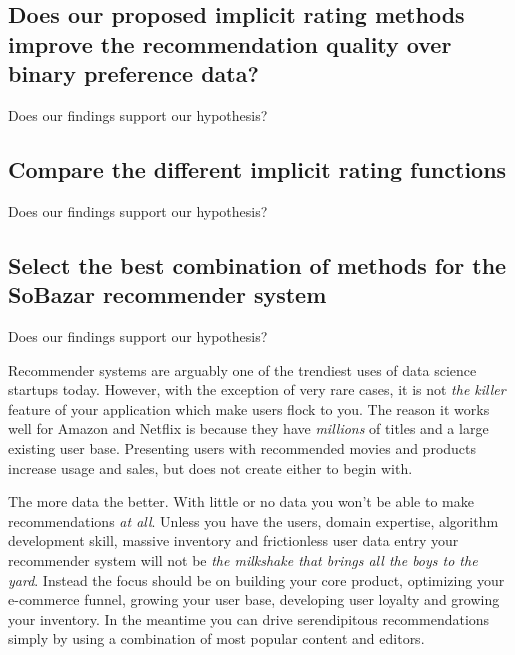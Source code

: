\subsection{Does our proposed implicit rating methods improve the recommendation quality over binary preference data?}

Does our findings support our hypothesis?



\subsection{Compare the different implicit rating functions}

Does our findings support our hypothesis?

\subsection{Select the best combination of methods for the SoBazar recommender system}

Does our findings support our hypothesis?












Recommender systems are arguably one of the trendiest uses of data science startups today. However, with the exception of very
rare cases, it is not \emph{the killer} feature of your application which make users flock to you. The reason it works
well for Amazon and Netflix is because they have \emph{millions} of titles and a large existing user base. Presenting users
with recommended movies and products increase usage and sales, but does not create either to begin with.

The more data the better. With little or no data you won't be able to make recommendations \emph{at all}. Unless you have the users, domain expertise, algorithm development skill, massive inventory and frictionless user data entry your recommender
system will not be \emph{the milkshake that brings all the boys to the yard}. Instead the focus should be on building your core product, optimizing your e-commerce funnel, growing your user base, developing user loyalty and growing your inventory. In the meantime you can drive serendipitous recommendations simply by using a combination of most popular content and editors.









